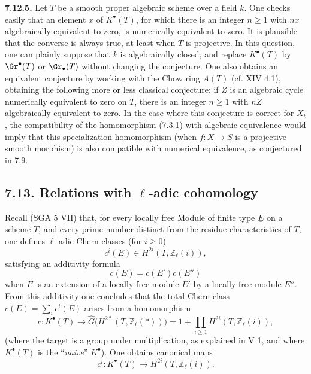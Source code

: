 \textbf{7.12.5.} Let \(T\) be a smooth proper algebraic scheme over a field \(k\). One checks easily that an element \(x\) of \(K^\bullet(T)\), for which there is an integer \(n\geq1\) with \(nx\) algebraically equivalent to zero, is numerically equivalent to zero. It is plausible that the converse is always true, at least when \(T\) is projective. In this question, one can plainly suppose that \(k\) is algebraically closed, and replace \(K^\bullet(T)\) by \(\Gr^\bullet(T)\) or \(\Gr_\bullet(T)\) without changing the conjecture. One also obtains an equivalent conjecture by working with the Chow ring \(A(T)\) (cf. XIV 4.1), obtaining the following more or less classical conjecture: if \(Z\) is an algebraic cycle numerically equivalent to zero on \(T\), there is an integer \(n\geq1\) with \(nZ\) algebraically equivalent to zero. In the case where this conjecture is correct for \(X_t\), the compatibility of the homomorphism (7.3.1) with algebraic equivalence would imply that this specialization homomorphism (when \(f:X\to S\) is a projective smooth morphism) is also compatible with numerical equivalence, as conjectured in 7.9.

%

\subsection*{7.13. Relations with \(\ell\)-adic cohomology}
Recall (SGA 5 VII) that, for every locally free Module of finite type \(\underline{E}\) on a scheme \(T\), and every prime number distinct from the residue characteristics of \(T\), one defines \(\ell\)-adic Chern classes (for \(i\geq 0\))
\[
  c^i(E)\in H^{2i}(T,\mathbb Z_\ell(i)),
\]
satisfying an additivity formula
\[
  c(E)=c(E')c(E'')
\]
when \(E\) is an extension of a locally free module \(E'\) by a locally free module \(E''\). From this additivity one concludes that the total Chern class \(c(E)=\sum_i c^i(E)\) arises from a homomorphism
\begin{equation}\tag{7.13.0}
  c:K^\bullet(T)\longrightarrow
  \widehat G\bigl(H^{2*}(T,\mathbb Z_\ell(*))\bigr)
  =
  1+\prod_{i\geq 1}H^{2i}(T,\mathbb Z_\ell(i)),
\end{equation}
(where the target is a group under multiplication, as explained in V 1, and where \(K^\bullet(T)\) is the ``\emph{naive}'' \(K^\bullet\)). One obtains canonical maps
\begin{equation}\tag{7.13.1}
  c^i:K^\bullet(T)\longrightarrow H^{2i}(T,\mathbb Z_\ell(i)).
\end{equation}

